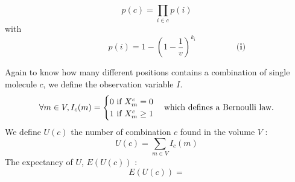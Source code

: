 \documentclass{article}  %
\begin{document}
\[
p(c) = \prod_{i \in c}p(i)
\]
with 
\[
\hspace{2cm} p(i) = 1-(1-\frac{1}{v})^{k_i} \hspace{2cm} \textbf{(i)}
\]

Again to know how many different positions contains a combination of single molecule $c$, we define the observation variable $I$.
\[
\forall m \in V, I_c(m) = \begin{cases}
    0 \text{ if } X^c_m = 0 \\
    1 \text{ if } X^c_m \geq 1
\end{cases}
\text{which defines a Bernoulli law.}\linebreak
\]
We define $U(c)$ the number of combination $c$ found in the volume $V$ :
\[
U(c) = \sum_{m \in V}I_c(m)
\]
The expectancy of $U$, $E(U(c))$ :
\[
E(U(c)) = 
\]







\begin{figure}[h]
\centering
\end{figure}
\end{document}
